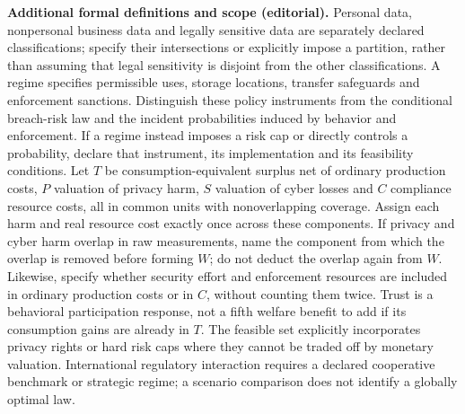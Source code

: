 \documentclass[11pt,a4paper]{article}
\begin{document}
\textbf{Additional formal definitions and scope (editorial).} Personal data, nonpersonal business data and legally sensitive data are separately declared classifications; specify their intersections or explicitly impose a partition, rather than assuming that legal sensitivity is disjoint from the other classifications. A regime specifies permissible uses, storage locations, transfer safeguards and enforcement sanctions. Distinguish these policy instruments from the conditional breach-risk law and the incident probabilities induced by behavior and enforcement. If a regime instead imposes a risk cap or directly controls a probability, declare that instrument, its implementation and its feasibility conditions. Let \(T\) be consumption-equivalent surplus net of ordinary production costs, \(P\) valuation of privacy harm, \(S\) valuation of cyber losses and \(C\) compliance resource costs, all in common units with nonoverlapping coverage. Assign each harm and real resource cost exactly once across these components. If privacy and cyber harm overlap in raw measurements, name the component from which the overlap is removed before forming \(W\); do not deduct the overlap again from \(W\). Likewise, specify whether security effort and enforcement resources are included in ordinary production costs or in \(C\), without counting them twice. Trust is a behavioral participation response, not a fifth welfare benefit to add if its consumption gains are already in \(T\). The feasible set explicitly incorporates privacy rights or hard risk caps where they cannot be traded off by monetary valuation. International regulatory interaction requires a declared cooperative benchmark or strategic regime; a scenario comparison does not identify a globally optimal law.
\end{document}
